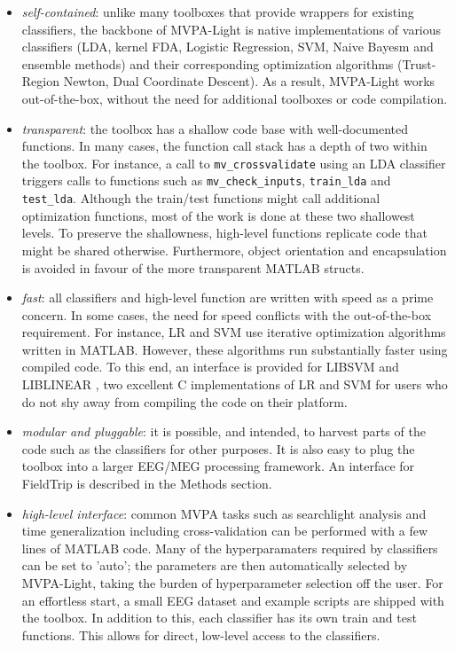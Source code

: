 \documentclass[utf8]{frontiersSCNS} %
\begin{document}

\begin{itemize}
\item \textit{self-contained}: unlike many toolboxes that provide wrappers for existing classifiers, the backbone of MVPA-Light is  native implementations of various classifiers (LDA, kernel FDA, Logistic Regression, SVM, Naive Bayesm and ensemble methods) and their corresponding optimization algorithms (Trust-Region Newton, Dual Coordinate Descent). As a result, MVPA-Light works out-of-the-box, without the need for additional toolboxes or  code compilation.
\item \textit{transparent}: the toolbox has a shallow code base with well-documented functions. In many cases, the function call stack has a depth of two within the toolbox. For instance, a call to \texttt{mv\_crossvalidate} using an LDA classifier triggers calls to functions such as  \texttt{mv\_check\_inputs}, \texttt{train\_lda} and \texttt{test\_lda}. Although the train/test functions might call additional optimization functions, most of the work is done at these two shallowest levels. To preserve the shallowness, high-level functions replicate code that might be shared otherwise. Furthermore, object orientation and encapsulation is avoided in favour of the more transparent MATLAB structs.
\item \textit{fast}: all classifiers and high-level function are written with speed as a prime concern. In some cases, the need for speed conflicts with the out-of-the-box requirement. For instance, LR and SVM use iterative optimization algorithms written in MATLAB. However, these algorithms run substantially faster using compiled code. To this end, an interface is provided for LIBSVM \citep{Chang2011LIBSVM:Machines} and LIBLINEAR \citep{Fan2008}, two excellent C implementations of LR and SVM for users who do not shy away from compiling the code on their platform.
\item \textit{modular and pluggable}: it is possible, and intended, to harvest parts of the code such as the classifiers for other purposes. It is also easy to plug the toolbox into a larger EEG/MEG processing framework. An interface for FieldTrip \citep{Oostenveld2011} is described in the Methods section.
\item \textit{high-level interface}: common MVPA tasks such as searchlight analysis and time generalization including cross-validation can be performed with a few lines of MATLAB code. Many of the hyperparamaters required by classifiers can be set to 'auto'; the parameters are then automatically selected by MVPA-Light, taking the burden of hyperparameter selection off the user. For an effortless start, a small EEG dataset and example scripts are shipped with the toolbox. In addition to this, each classifier has its own train and test functions. This allows for direct, low-level access to the classifiers. 
\end{itemize}
\end{document}
